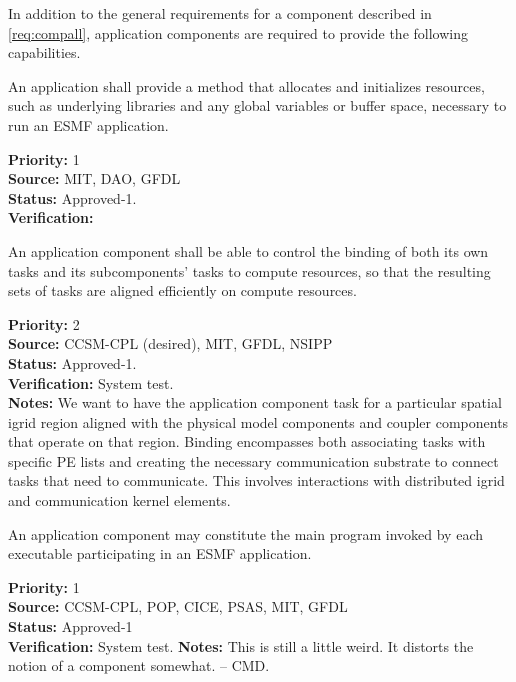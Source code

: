 
In addition to the general requirements for a component described in 
\ref{req:compall}, application components are required to provide the
following capabilities.

An application shall provide a method that allocates and initializes 
resources, such as underlying libraries and any global variables or 
buffer space, necessary to run an ESMF application.
\begin{reqlist}
{\bf Priority:} 1 \\
{\bf Source:} MIT, DAO, GFDL \\
{\bf Status:} Approved-1.\\
{\bf Verification:}  
\end{reqlist}


An application component shall be able to control the binding of both its own
tasks and its subcomponents' tasks to compute resources, so that the resulting
sets of tasks are aligned efficiently on compute resources.

\begin{reqlist}
{\bf Priority:} 2 \\
{\bf Source:}  CCSM-CPL (desired), MIT, GFDL, NSIPP \\
{\bf Status:} Approved-1. \\
{\bf Verification:} System test.\\
{\bf Notes:}  We want to have the application component task for a particular
  spatial igrid region aligned with the physical model components and
  coupler components that operate on that region.  Binding
  encompasses both associating tasks with specific PE lists and
  creating the necessary communication substrate to connect tasks that
  need to communicate.  This involves interactions with distributed
  igrid and communication kernel elements.
\end{reqlist}

An application component may constitute the main program invoked by each
executable participating in an ESMF application.
\begin{reqlist}
{\bf Priority:} 1\\
{\bf Source:} CCSM-CPL, POP, CICE, PSAS, MIT, GFDL \\
{\bf Status:} Approved-1 \\
{\bf Verification:} System test.
{\bf Notes:}  This is still a little weird.  It distorts the notion of a
component somewhat.  -- CMD.
\end{reqlist}

